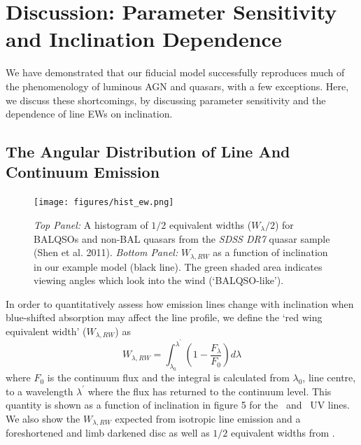 \documentclass[useAMS,usenatbib]{mn2e_x}
\begin{document}



 \section{Discussion: Parameter Sensitivity and Inclination Dependence}

 We have demonstrated that our fiducial model successfully reproduces much of
 the phenomenology of luminous AGN and quasars, with a few exceptions.
 Here, we discuss these shortcomings, by discussing parameter sensitivity
 and the dependence of line EWs on inclination.

\subsection{The Angular Distribution of Line And Continuum Emission}
\label{sec:angular}

\begin{figure}
\centering
\texttt{[image: figures/hist\_ew.png]}
\caption
{
{\sl Top Panel:} A histogram of $1/2$ equivalent widths ($W_{\lambda}/2$)
for BALQSOs and non-BAL quasars from the {\sl SDSS DR7} quasar sample (Shen et al. 2011).
{\sl Bottom Panel:} $W_{\lambda,RW}$ as a function of inclination in our example model (black line).
The green shaded area indicates viewing angles which look into the wind (`BALQSO-like').
}
\label{fig:ew}
\end{figure}



In order to quantitatively assess how emission lines change with 
inclination when blue-shifted absorption 
may affect the line profile, we define the `red wing equivalent width' ($W_{\lambda,RW}$) as
\begin{equation}
W_{\lambda,RW} = \int_{\lambda_0}^{\lambda^\prime} \left( 1 - \frac{F_\lambda}{F_0} \right) d\lambda
\label{rwew}
\end{equation}
where $F_0$ is the continuum flux and the integral is calculated from $\lambda_0$, line centre,
to a wavelength $\lambda^\prime$ where the flux has returned to the continuum level.
This quantity is shown as a function of inclination in figure 5 for the \civ\ and \mg\ UV lines.
We also show the $W_{\lambda,RW}$ expected from isotropic line emission and a foreshortened 
and limb darkened disc  as well as $1/2$ equivalent widths from \cite{dipompeo2012b}. 
\end{document}
